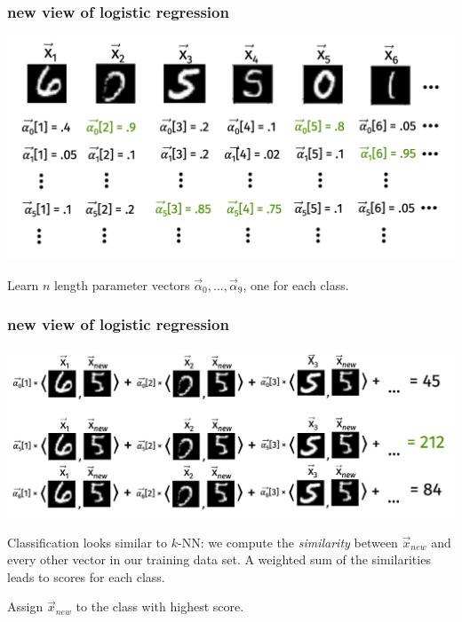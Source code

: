 \documentclass[handout,compress]{beamer}
\begin{document}
\begin{frame}
	\frametitle{new view of logistic regression}
	\begin{center}
		\includegraphics[width=\textwidth]{scores.png}
		
		Learn $n$ length parameter vectors $\vec{\alpha}_0,\ldots, \vec{\alpha}_{9}$, one for each class.
	\end{center}
\end{frame}

\begin{frame}
	\frametitle{new view of logistic regression}
	\begin{center}
		\includegraphics[width=\textwidth]{new_form.png}
		
		Classification looks similar to $k$-NN: we compute the \emph{similarity} between $\vec{x}_{new}$ and every other vector in our training data set. A weighted sum of the similarities leads to scores for each class. 
	\end{center}
Assign $\vec{x}_{new}$ to the class with highest score. 
\end{frame}
\end{document}
